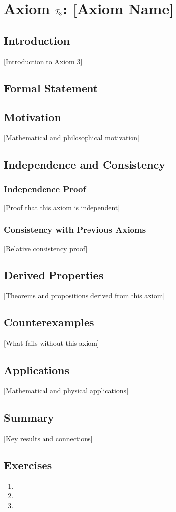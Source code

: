 \chapter{Axiom $\mathcal{I}_3$: [Axiom Name]}
\label{ch:axiom-I3}

\section{Introduction}
[Introduction to Axiom 3]

\section{Formal Statement}
\begin{axiom}
\end{axiom}

\section{Motivation}
[Mathematical and philosophical motivation]

\section{Independence and Consistency}
\subsection{Independence Proof}
[Proof that this axiom is independent]

\subsection{Consistency with Previous Axioms}
[Relative consistency proof]

\section{Derived Properties}
[Theorems and propositions derived from this axiom]

\section{Counterexamples}
[What fails without this axiom]

\section{Applications}
[Mathematical and physical applications]

\section{Summary}
[Key results and connections]

\section{Exercises}
\begin{enumerate}
\item [Exercise 1]
\item [Exercise 2]
\item [Exercise 3]
\end{enumerate}
